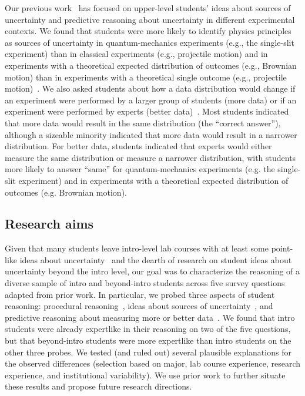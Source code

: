 \documentclass[english,aps,prstper,reprint,showpacs,longbibliography,superscriptaddress,nofootinbib]{revtex4-2}
\begin{document}
Our previous work~\cite{Stein2019,Stump2020,White2020,StumpTBD,SchangTBD} has focused on upper-level students' ideas about sources of uncertainty and predictive reasoning about uncertainty in different experimental contexts. We found that students were more likely to identify physics principles as sources of uncertainty in quantum-mechanics experiments (e.g., the single-slit experiment) than in classical experiments (e.g., projectile motion) and in experiments with a theoretical expected distribution of outcomes (e.g., Brownian motion) than in experiments with a theoretical single outcome (e.g., projectile motion)~\cite{Stein2019,Stump2020,StumpTBD}. We also asked students about how a data distribution would change if an experiment were performed by a larger group of students (more data) or if an experiment were performed by experts (better data)~\cite{Stein2019,White2020,SchangTBD}. Most students indicated that more data would result in the same distribution (the ``correct answer''), although a sizeable minority indicated that more data would result in a narrower distribution. For better data, students indicated that experts would either measure the same distribution or measure a narrower distribution, with students more likely to answer ``same'' for quantum-mechanics experiments (e.g. the single-slit experiment) and in experiments with a theoretical expected distribution of outcomes (e.g. Brownian motion).

\subsection{Research aims}

Given that many students leave intro-level lab courses with at least some point-like ideas about uncertainty~\cite{Kung2005,Volkwyn2008,Wan2022,Pollard2020,Kung2006,Pillay2008} and the dearth of research on student ideas about uncertainty beyond the intro level, our goal was to characterize the reasoning of a diverse sample of intro and beyond-intro students across five survey questions adapted from prior work. In particular, we probed three aspects of student reasoning: procedural reasoning~\cite{Allie1998,Buffler2001,Lubben2001}, ideas about sources of uncertainty~\cite{StumpTBD}, and predictive reasoning about measuring more or better data~\cite{SchangTBD}. We found that intro students were already expertlike in their reasoning on two of the five questions, but that beyond-intro students were more expertlike than intro students on the other three probes. We tested (and ruled out) several plausible explanations for the observed differences (selection based on major, lab course experience, research experience, and institutional variability). We use prior work to further situate these results and propose future research directions.
\end{document}
